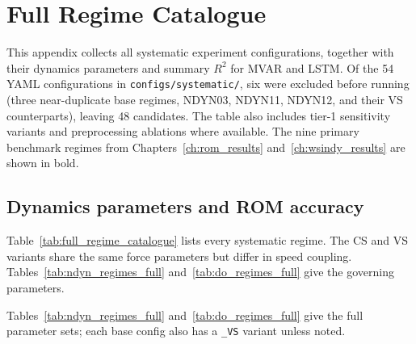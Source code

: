 \chapter{Full Regime Catalogue}
\label{app:full_regime_catalogue}

This appendix collects all systematic experiment configurations,
together with their dynamics parameters and summary
$R^2$ for MVAR and LSTM\@.  Of the 54 YAML configurations in
\texttt{configs/systematic/}, six were excluded before running
(three near-duplicate base regimes, NDYN03, NDYN11,
NDYN12, and their VS counterparts), leaving 48 candidates.
The table also includes tier-1 sensitivity variants and
preprocessing ablations where available.  The nine primary benchmark
regimes from Chapters~\ref{ch:rom_results} and~\ref{ch:wsindy_results}
are shown in bold.

\section{Dynamics parameters and ROM accuracy}
\label{sec:regime_catalogue_table}

Table~\ref{tab:full_regime_catalogue} lists every systematic regime.
The CS and VS variants share the same force parameters but differ in speed
coupling.  Tables~\ref{tab:ndyn_regimes_full} and~\ref{tab:do_regimes_full}
give the governing parameters.

\begin{table}[htbp]
\centering
\caption{Mean test $R^2$ for MVAR and LSTM across all systematic experiments.
Bold = nine main-text regimes; ---$^\dagger$ = LSTM diverged ($R^2<{-}2$);
---$^*$ = MVAR not evaluated for preprocessing ablation variants.}
\label{tab:full_regime_catalogue}

\end{table}

Tables~\ref{tab:ndyn_regimes_full} and~\ref{tab:do_regimes_full} give the
full parameter sets; each base config also has a \texttt{\_VS} variant
unless noted.

